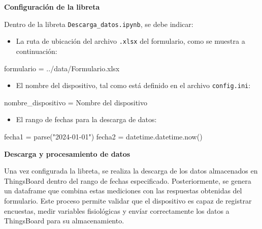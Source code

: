 \documentclass[
  12pt,
  letterpaper,
  DIV=11,
  numbers=noendperiod]{scrreport}
\newenvironment{Shaded}{\begin{snugshade}}{\end{snugshade}}
\newcommand{\NormalTok}[1]{\textcolor[rgb]{0.00,0.23,0.31}{#1}}
\newcommand{\OperatorTok}[1]{\textcolor[rgb]{0.37,0.37,0.37}{#1}}
\newcommand{\StringTok}[1]{\textcolor[rgb]{0.13,0.47,0.30}{#1}}
\providecommand{\tightlist}{%
  \setlength{\itemsep}{0pt}\setlength{\parskip}{0pt}}\usepackage{longtable,booktabs,array}
\begin{document}
\textbf{Configuración de la libreta}

Dentro de la libreta \texttt{Descarga\_datos.ipynb}, se debe indicar:

\begin{itemize}
\tightlist
\item
  La ruta de ubicación del archivo \texttt{.xlsx} del formulario, como
  se muestra a continuación:
\end{itemize}

\begin{Shaded}
\begin{Highlighting}[]
\NormalTok{formulario }\OperatorTok{=} \StringTok{\textquotesingle{}../data/Formulario.xlsx\textquotesingle{}}         
\end{Highlighting}
\end{Shaded}

\begin{itemize}
\tightlist
\item
  El nombre del dispositivo, tal como está definido en el archivo
  \texttt{config.ini}:
\end{itemize}

\begin{Shaded}
\begin{Highlighting}[]
\NormalTok{nombre\_dispositivo }\OperatorTok{=} \StringTok{\textquotesingle{}Nombre del dispositivo\textquotesingle{}}   
\end{Highlighting}
\end{Shaded}

\begin{itemize}
\tightlist
\item
  El rango de fechas para la descarga de datos:
\end{itemize}

\begin{Shaded}
\begin{Highlighting}[]
\NormalTok{fecha1 }\OperatorTok{=}\NormalTok{ parse(}\StringTok{"2024{-}01{-}01"}\NormalTok{)  }
\NormalTok{fecha2 }\OperatorTok{=}\NormalTok{ datetime.datetime.now()}
\end{Highlighting}
\end{Shaded}

\textbf{Descarga y procesamiento de datos}

Una vez configurada la libreta, se realiza la descarga de los datos
almacenados en ThingsBoard dentro del rango de fechas especificado.
Posteriormente, se genera un dataframe que combina estas mediciones con
las respuestas obtenidas del formulario. Este proceso permite validar
que el dispositivo es capaz de registrar encuestas, medir variables
fisiológicas y envíar correctamente los datos a ThingsBoard para su
almacenamiento.
\end{document}
